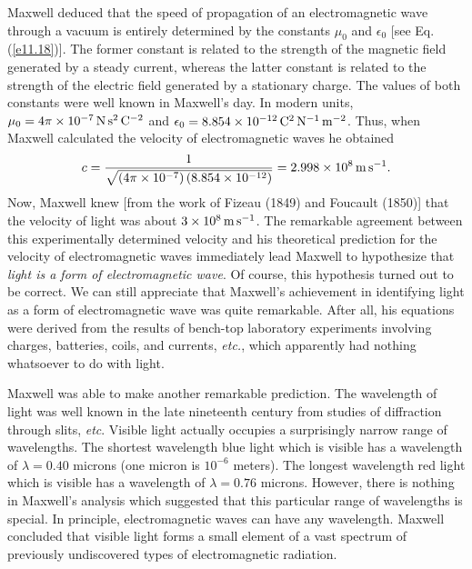 Maxwell deduced that the speed of propagation of an electromagnetic
wave through a vacuum is entirely 
determined by the constants $\mu_0$ and $\epsilon_0$
[see Eq. (\ref{e11.18})]. The former constant is related to the strength of the
magnetic field generated by a steady current, whereas the latter constant
is related to the strength of the electric field generated by a stationary
charge. The values of both constants
were well known in Maxwell's day. In modern units,
$\mu_0 = 4\pi\times 10^{-7}\,{\rm N}\,{\rm s}^2 \,{\rm C}^{-2}$ and
$\epsilon_0 = 8.854\times 10^{-12}\,{\rm C}^2\,{\rm N}^{-1} \,{\rm m}^{-2}$.
Thus, when Maxwell calculated the velocity of electromagnetic waves he obtained
\begin{equation}
c = \frac{1}{\sqrt{(4\pi\times 10^{-7})\,(8.854\times 10^{-12})} }= 2.998
\times 10^8 \,{\rm m}\,{\rm s}^{-1}.
\end{equation}
Now, Maxwell knew [from the work of Fizeau (1849) and Foucault (1850)] that
the velocity of light was about $3\times 10^8\,{\rm m}\,{\rm s}^{-1}$. 
The remarkable agreement between this experimentally determined velocity  and his 
theoretical prediction for the velocity of electromagnetic waves immediately
lead Maxwell to hypothesize that {\em light is a form of electromagnetic wave}.
Of course, this hypothesis turned out to be correct. 
We can still appreciate that Maxwell's achievement in identifying light as
a form of electromagnetic wave   was
quite
remarkable. After all, his  equations were derived from 
the results of bench-top
laboratory experiments involving charges, batteries, coils, and currents,
{\em etc.},  
which apparently
had nothing
whatsoever to do with light. 

Maxwell was able to make another remarkable prediction. The wavelength of
light was well known in the late nineteenth century from studies of diffraction
through slits, {\em etc}. 
Visible light actually occupies a surprisingly
narrow range of  wavelengths. The shortest wavelength blue light which is visible
 has a wavelength of $\lambda= 0.40$ microns (one micron is $10^{-6}$ meters).
The longest wavelength red light which is visible has a wavelength of
$\lambda= 0.76$ microns. However, there is nothing in Maxwell's
 analysis which suggested that
this particular range of wavelengths is special.
In principle,  electromagnetic waves
can have any wavelength. 
Maxwell concluded that visible light forms
 a small element  of a vast spectrum of
previously undiscovered
types of electromagnetic radiation. 

